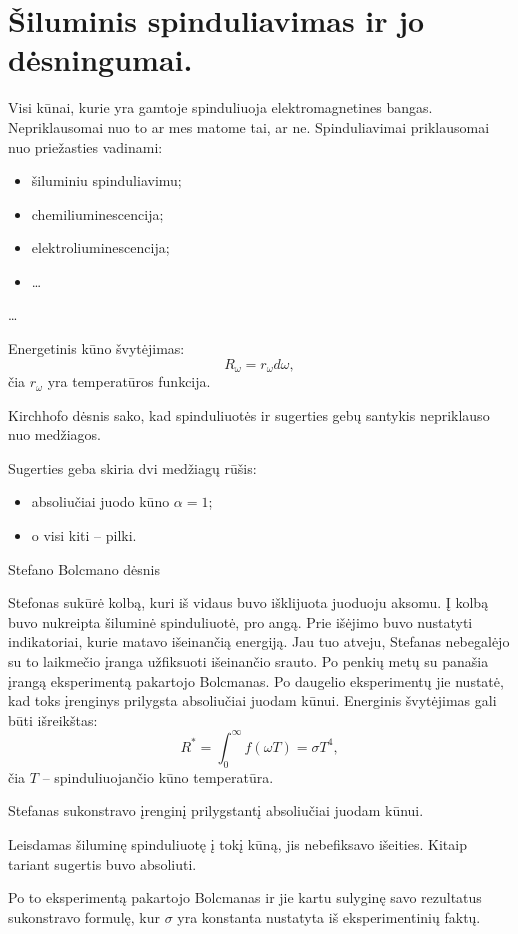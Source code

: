\chapter{Šiluminis spinduliavimas ir jo dėsningumai.}


Visi kūnai, kurie yra gamtoje spinduliuoja elektromagnetines bangas.
Nepriklausomai nuo to ar mes matome tai, ar ne. Spinduliavimai
priklausomai nuo priežasties vadinami:
\begin{itemize}
  \item šiluminiu spinduliavimu;
  \item chemiliuminescencija;
  \item elektroliuminescencija;
  \item …
\end{itemize}

…

Energetinis kūno švytėjimas:
\begin{equation*}
  R_{\omega} = r_{\omega} d \omega,
\end{equation*}
čia $r_{\omega}$ yra temperatūros funkcija.

Kirchhofo dėsnis sako, kad spinduliuotės ir sugerties gebų santykis
nepriklauso nuo medžiagos.

Sugerties geba skiria dvi medžiagų rūšis:
\begin{itemize}
  \item absoliučiai juodo kūno $\alpha = 1$;
  \item o visi kiti – pilki.
\end{itemize}

Stefano Bolcmano dėsnis

Stefonas sukūrė kolbą, kuri iš vidaus buvo išklijuota juoduoju aksomu.
Į kolbą buvo nukreipta šiluminė spinduliuotė, pro angą. Prie išėjimo
buvo nustatyti indikatoriai, kurie matavo išeinančią energiją.
Jau tuo atveju, Stefanas nebegalėjo su to laikmečio įranga
užfiksuoti išeinančio srauto. Po penkių metų su panašia įrangą
eksperimentą pakartojo Bolcmanas. Po daugelio eksperimentų jie
nustatė, kad toks įrenginys prilygsta absoliučiai juodam kūnui.
Energinis švytėjimas gali būti išreikštas:
\begin{equation*}
  R^{*} = \int _{0} ^{\infty} f (\omega T) = \sigma T^{4},
\end{equation*}
čia $T$ – spinduliuojančio kūno temperatūra.

\begin{remember}
  \item Stefanas sukonstravo įrenginį prilygstantį absoliučiai juodam
    kūnui.
  \item Leisdamas šiluminę spinduliuotę į tokį kūną, jis nebefiksavo
    išeities. Kitaip tariant sugertis buvo absoliuti.
  \item Po to eksperimentą pakartojo Bolcmanas ir jie kartu sulyginę
    savo rezultatus sukonstravo formulę, kur $\sigma$ yra konstanta
    nustatyta iš eksperimentinių faktų.
\end{remember}


